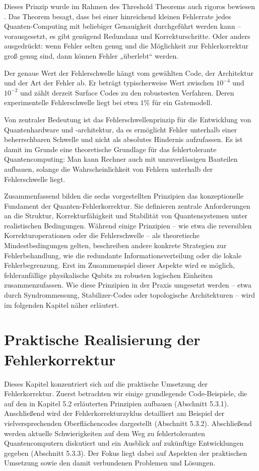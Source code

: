 Dieses Prinzip wurde im Rahmen des Threshold Theorems auch rigoros bewiesen \cite{aharonov_fault-tolerant_1997}. Das Theorem besagt, dass bei einer hinreichend kleinen Fehlerrate jedes Quanten-Computing mit beliebiger Genauigkeit durchgeführt werden kann – vorausgesetzt, es gibt genügend Redundanz und Korrekturschritte. Oder anders ausgedrückt: wenn Fehler selten genug und die Möglichkeit zur Fehlerkorrektur groß genug sind, dann können Fehler „überlebt“ werden.

Der genaue Wert der Fehlerschwelle hängt vom gewählten Code, der Architektur und der Art der Fehler ab. Er beträgt typischerweise  Wert zwischen \(
    10^{-4}
\)  und \(
    10^{-2}
\) und zählt derzeit Surface Codes zu den robustesten Verfahren. Deren experimentelle Fehlerschwelle liegt bei etwa \(1 \%\) für 
ein Gatemodell. \cite{fowler_surface_2012}

Von zentraler Bedeutung ist das Fehlerschwellenprinzip für die Entwicklung von Quantenhardware und -architektur, da es ermöglicht Fehler unterhalb einer beherrschbaren Schwelle und nicht als absolutes Hindernis aufzufassen. Es ist damit im Grunde eine theoretische Grundlage für das fehlertolerante Quantencomputing: Man kann Rechner auch mit unzuverlässigen Bauteilen aufbauen, solange die Wahrscheinlichkeit von Fehlern unterhalb der Fehlerschwelle liegt.

Zusammenfassend bilden die sechs vorgestellten Prinzipien das konzeptionelle Fundament der Quanten-Fehlerkorrektur. Sie definieren zentrale Anforderungen an die Struktur, Korrekturfähigkeit und Stabilität von Quantensystemen unter realistischen Bedingungen. Während einige Prinzipien – wie etwa die reversiblen Korrekturoperationen oder die Fehlerschwelle – als theoretische Mindestbedingungen gelten, beschreiben andere konkrete Strategien zur Fehlerbehandlung, wie die redundante Informationsverteilung oder die lokale Fehlerbegrenzung. Erst im Zusammenspiel dieser Aspekte wird es möglich, fehleranfällige physikalische Qubits zu robusten logischen Einheiten zusammenzufassen. Wie diese Prinzipien in der Praxis umgesetzt werden – etwa durch Syndrommessung, Stabilizer-Codes oder topologische Architekturen – wird im folgenden Kapitel näher erläutert.

\section{Praktische Realisierung der Fehlerkorrektur}\label{chap:QEC3}

Dieses Kapitel konzentriert sich auf die praktische Umsetzung der Fehlerkorrektur.
Zuerst betrachten wir einige grundlegende Code-Beispiele, die auf den in Kapitel 5.2 erläuterten Prinzipien aufbauen (Abschnitt 5.3.1). Anschließend wird der Fehlerkorrekturzyklus detailliert am Beispiel der vielversprechenden Oberflächencodes dargestellt (Abschnitt 5.3.2). Abschließend werden aktuelle Schwierigkeiten auf dem Weg zu fehlertoleranten Quantencomputern diskutiert und ein Ausblick auf zukünftige Entwicklungen gegeben (Abschnitt 5.3.3). Der Fokus liegt dabei auf Aspekten der praktischen Umsetzung sowie den damit verbundenen Problemen und Lösungen.

